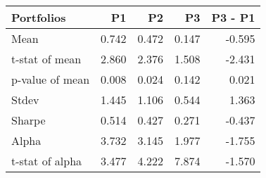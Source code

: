 \begin{tabular}{lrrrr}
\toprule
Portfolios & P1 & P2 & P3 & P3 - P1 \\
\midrule
Mean & 0.742 & 0.472 & 0.147 & -0.595 \\
t-stat of mean & 2.860 & 2.376 & 1.508 & -2.431 \\
p-value of mean & 0.008 & 0.024 & 0.142 & 0.021 \\
Stdev & 1.445 & 1.106 & 0.544 & 1.363 \\
Sharpe & 0.514 & 0.427 & 0.271 & -0.437 \\
Alpha & 3.732 & 3.145 & 1.977 & -1.755 \\
t-stat of alpha & 3.477 & 4.222 & 7.874 & -1.570 \\
\bottomrule
\end{tabular}
